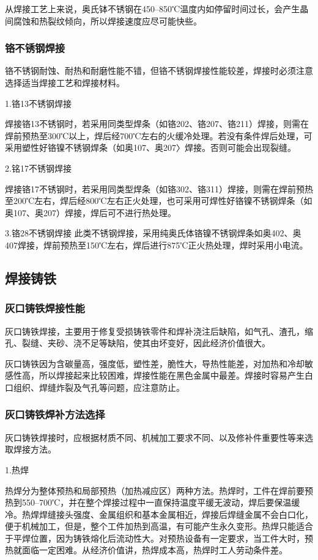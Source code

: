 \documentclass{ctexbook}
\begin{document}
从焊接工艺上来说，奥氏钵不锈钢在450--850℃温度内如停留时间过长，会产生晶间腐蚀和热裂纹倾向，所以焊接速度应尽可能快些。
\subsubsection{铬不锈钢焊接}
铬不锈钢耐蚀、耐热和耐磨性能不错，但铬不锈钢焊接性能较差，焊接时必须注意选择适当焊接工艺和焊接材料。

1.铬13不锈钢焊接

焊接铬13不锈钢时，若采用同类型焊条（如铬202、铬207、铬211）焊接，则需在焊前预热至300℃以上，焊后经700℃左右的火缓冷处理。若没有条件焊后处理，可采用塑性好铬镍不锈钢焊条（如奥107、奥207〉焊接。否则可能会出现裂缝。

2.铭17不锈钢焊接

焊接铬17不锈钢时，若采用同类型焊条（如铬302、铬311）焊接，则需在焊前预热至200℃左右，焊后经800℃左右正火处理，也可采用可焊性好铬镍不锈钢焊条（如奥107、奥207）焊接，焊后可不进行热处理。

3.铬28不锈钢焊接
此类不锈钢焊接，采用纯奥氏体铬镍不锈钢焊条如奥402、奥407焊接，焊前预热至150℃左右，焊后进行875℃正火热处理，焊时采用小电流。
\subsection{焊接铸铁}
\subsubsection{灰口铸铁焊接性能}
灰口铸铁焊接，主要用于修复受损铸铁零件和焊补浇注后缺陷，如气孔、渣孔，缩孔、裂缝、夹砂、浇不足等缺陷，使其由坏变好，因此经济价值很大。

灰口铸铁因为含碳量高，强度低，塑性差，脆性大，导热性能差，对加热和冷却敏感性高，所以焊接起来比较困难，焊接性能在黑色金属中最差。焊接时容易产生白口组织、焊缝炸裂及气孔等问题，应注意防止。
\subsubsection{灰口铸铁焊补方法选择}
灰口铸铁焊接时，应根据材质不同、机械加工要求不同、以及修补件重要性等来选取焊接方法。

1.热焊

热焊分为整体预热和局部预热（加热减应区）两种方法。热焊时，工件在焊前要预热到550--700℃，并在整个焊接过程中一直保持温度平缓无波动，焊后要保温缓冷。热焊焊缝接头强度、金属组织和基本金属相近，焊接后焊缝金属不会白口化，便于机械加工，但是，整个工件加热到高温，有可能产生永久变形。热焊只能适合于平焊位置，因为铸铁熔化后流动性大。对预热设备有一定要求，当工件大时，预热就面临一定困难。从经济价值讲，热焊成本高，热焊时工人劳动条件差。
\end{document}

